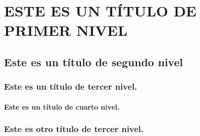 \chapter{ESTE ES UN TÍTULO DE PRIMER NIVEL}


\lipsum[1-2]

\section{Este es un título de segundo nivel}
%
\lipsum[3-4]

\subsection{Este es un título de tercer nivel.}
%
\lipsum[5]

\subsubsection{Este es un título de cuarto nivel.}
%
\lipsum[7]

\subsection{Este es otro  título de tercer nivel.}
%
\lipsum[7]

